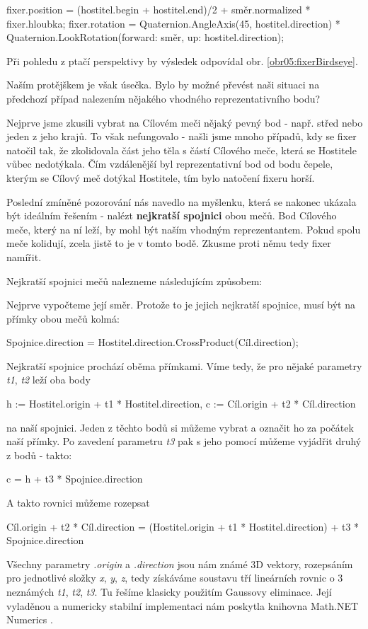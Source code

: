 \begin{code}
fixer.position = 
  (hostitel.begin + hostitel.end)/2 
  + směr.normalized * fixer.hloubka;
fixer.rotation = 
  Quaternion.AngleAxis(45, hostitel.direction)
  * Quaternion.LookRotation(forward: směr, up: hostitel.direction);
\end{code}
Při pohledu z ptačí perspektivy by výsledek odpovídal obr. \ref{obr05:fixerBirdseye}. 

\bigbreak

Naším protějškem je však úsečka. Bylo by možné převést naši situaci na předchozí případ nalezením nějakého vhodného reprezentativního bodu?

Nejprve jsme zkusili vybrat na Cílovém meči nějaký pevný bod - např. střed nebo jeden z jeho krajů. To však nefungovalo - našli jsme mnoho případů, kdy se fixer natočil tak, že zkolidovala část jeho těla s částí Cílového meče, která se Hostitele vůbec nedotýkala. Čím vzdálenější byl reprezentativní bod od bodu čepele, kterým se Cílový meč dotýkal Hostitele, tím bylo natočení fixeru horší.

Poslední zmíněné pozorování nás navedlo na myšlenku, která se nakonec ukázala být ideálním řešením - nalézt \textbf{nejkratší spojnici} obou mečů. Bod Cílového meče, který na ní leží, by mohl být naším vhodným reprezentantem. Pokud spolu meče kolidují, zcela jistě to je v tomto bodě. Zkusme proti němu tedy fixer namířit. 

\bigbreak

Nejkratší spojnici mečů nalezneme následujícím způsobem:

Nejprve vypočteme její směr. Protože to je jejich nejkratší spojnice, musí být na přímky obou mečů kolmá:
\begin{code}
 Spojnice.direction = Hostitel.direction.CrossProduct(Cíl.direction);
\end{code}

Nejkratší spojnice prochází oběma přímkami. Víme tedy, že pro nějaké parametry \textit{t1}, \textit{t2} leží oba body
\begin{code}
 h := Hostitel.origin + t1 * Hostitel.direction,
 c := Cíl.origin + t2 * Cíl.direction
\end{code}
na naší spojnici. Jeden z těchto bodů si můžeme vybrat a označit ho za počátek naší přímky. Po zavedení parametru \textit{t3} pak s jeho pomocí můžeme vyjádřit druhý z bodů - takto:
\begin{code}
  c = h + t3 * Spojnice.direction
\end{code}
A takto rovnici můžeme rozepsat
\begin{code}
 Cíl.origin + t2 * Cíl.direction =
 (Hostitel.origin + t1 * Hostitel.direction) + t3 * Spojnice.direction
\end{code}
Všechny parametry \textit{.origin} a \textit{.direction} jsou nám známé 3D vektory, rozepsáním pro jednotlivé složky \textit{x}, \textit{y}, \textit{z}, tedy získáváme soustavu tří lineárních rovnic o 3 neznámých \textit{t1}, \textit{t2}, \textit{t3}. Tu řešíme klasicky použitím Gaussovy eliminace. Její vyladěnou a numericky stabilní implementaci nám poskytla knihovna Math.NET Numerics \cite{MathDotNetNumerics}.

